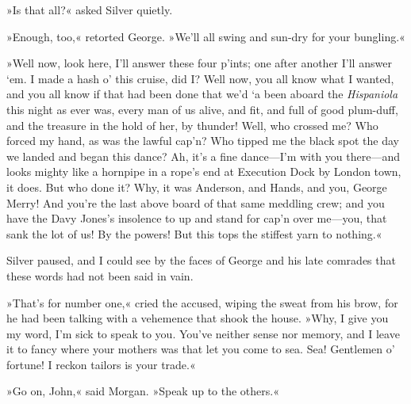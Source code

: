 »Is that all?« asked Silver quietly.

»Enough, too,« retorted George. »We'll all swing and sun-dry for your bungling.«

»Well now, look here, I'll answer these four p'ints; one after another I'll answer `em. I made a hash o' this cruise, did I? Well now, you all know what I wanted, and you all know if that had been done that we'd `a been aboard the \textit{Hispaniola} this night as ever was, every man of us alive, and fit, and full of good plum-duff, and the treasure in the hold of her, by thunder! Well, who crossed me? Who forced my hand, as was the lawful cap'n? Who tipped me the black spot the day we landed and began this dance? Ah, it's a fine dance—I'm with you there—and looks mighty like a hornpipe in a rope's end at Execution Dock by London town, it does. But who done it? Why, it was Anderson, and Hands, and you, George Merry! And you're the last above board of that same meddling crew; and you have the Davy Jones's insolence to up and stand for cap'n over me—you, that sank the lot of us! By the powers! But this tops the stiffest yarn to nothing.«

Silver paused, and I could see by the faces of George and his late comrades that these words had not been said in vain.

»That's for number one,« cried the accused, wiping the sweat from his brow, for he had been talking with a vehemence that shook the house. »Why, I give you my word, I'm sick to speak to you. You've neither sense nor memory, and I leave it to fancy where your mothers was that let you come to sea. Sea! Gentlemen o' fortune! I reckon tailors is your trade.«

»Go on, John,« said Morgan. »Speak up to the others.«

